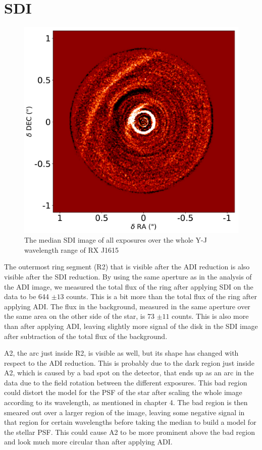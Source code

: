 \documentclass[twoside,single,12pt]{lion-msc}
\begin{document}
\clearpage
\section{SDI}
\begin{figure}
\vspace{-0.5 cm}
\centering
\includegraphics[width=\linewidth]{SDI_tot}
\caption{The median SDI image of all exposures over the whole Y-J wavelength range of RX J1615}
\label{fig:SDI_tot}
\vspace{-0.7 cm}
\end{figure}

The outermost ring segment (R2) that is visible after the ADI reduction is also visible after the SDI reduction. By using the same aperture as in the analysis of the ADI image, we measured the total flux of the ring after applying SDI on the data to be 644 $\pm 13$ counts. This is a bit more than the total flux of the ring after applying ADI. The flux in the background, measured in the same aperture over the same area on the other side of the star, is 73 $\pm 11$ counts. This is also more than after applying ADI, leaving slightly more signal of the disk in the SDI image after subtraction of the total flux of the background.  
\bigskip

A2, the arc just inside R2, is visible as well, but its shape has changed with respect to the ADI reduction. This is probably due to the dark region just inside A2, which is caused by a bad spot on the detector, that ends up as an arc in the data due to the field rotation between the different exposures. This bad region could distort the model for the PSF of the star after scaling the whole image according to its wavelength, as mentioned in chapter 4. The bad region is then smeared out over a larger region of the image, leaving some negative signal in that region for certain wavelengths before taking the median to build a model for the stellar PSF. This could cause A2 to be more prominent above the bad region and look much more circular than after applying ADI. 
\bigskip
\end{document}
